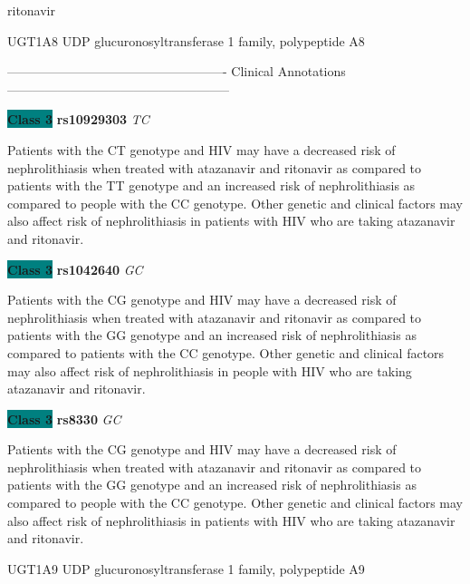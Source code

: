 \documentclass{resume} %
\begin{document}
\begin{rSection}{ ritonavir }
\begin{rSubsection}{ UGT1A8 }{ UDP glucuronosyltransferase 1 family, polypeptide A8 }{}{}
\item[] ---------------------------------------------------- Clinical Annotations -----------------------------------------------------\newline
\item \textbf{\colorbox{teal} {Class 3}} \textbf{ rs10929303 } \textit{ TC }
\item[] Patients with the CT genotype and HIV may have a decreased risk of nephrolithiasis when treated with atazanavir and ritonavir as compared to patients with the TT genotype and an increased risk of nephrolithiasis as compared to people with the CC genotype. Other genetic and clinical factors may also affect risk of nephrolithiasis in patients with HIV who are taking atazanavir and ritonavir. \item \textbf{\colorbox{teal} {Class 3}} \textbf{ rs1042640 } \textit{ GC }
\item[] Patients with the CG genotype and HIV may have a decreased risk of nephrolithiasis when treated with atazanavir and ritonavir as compared to patients with the GG genotype and an increased risk of nephrolithiasis as compared to patients with the CC genotype. Other genetic and clinical factors may also affect risk of nephrolithiasis in people with HIV who are taking atazanavir and ritonavir.\item \textbf{\colorbox{teal} {Class 3}} \textbf{ rs8330 } \textit{ GC }
\item[] Patients with the CG genotype and HIV may have a decreased risk of nephrolithiasis when treated with atazanavir and ritonavir as compared to patients with the GG genotype and an increased risk of nephrolithiasis as compared to people with the CC genotype. Other genetic and clinical factors may also affect risk of nephrolithiasis in patients with HIV who are taking atazanavir and ritonavir.
\end{rSubsection}\begin{rSubsection}{ UGT1A9 }{ UDP glucuronosyltransferase 1 family, polypeptide A9 }{}{}
\item[]


\end{rSubsection}
\end{rSection}
\end{document}
